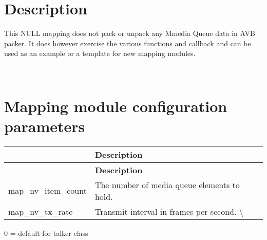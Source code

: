 \section*{Description}

This N\+U\+LL mapping does not pack or unpack any Mmedia Queue data in A\+VB packer. It does however exercise the various functions and callback and can be used as an example or a template for new mapping modules.

~\newline
 \section*{Mapping module configuration parameters}

\tabulinesep=1mm
\begin{longtabu} spread 0pt [c]{*2{|X[-1]}|}
\hline
{}&{\bf Description  }\\
\endfirsthead
\hline
\endfoot
\hline
{}&{\bf Description  }\\
\endhead
map\+\_\+nv\+\_\+item\+\_\+count &The number of media queue elements to hold. \\
map\+\_\+nv\+\_\+tx\+\_\+rate &Transmit interval in frames per second. \textbackslash{} \\
\end{longtabu}
0 = default for talker class 